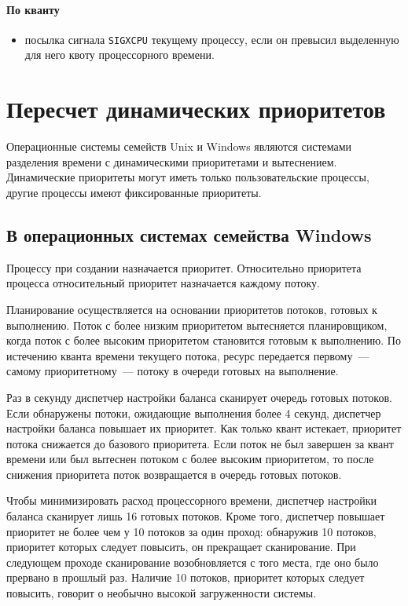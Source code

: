 \documentclass[14pt]{extarticle}
\begin{document}
\paragraph{По кванту}
\begin{itemize}
    \item посылка сигнала \texttt{SIGXCPU} текущему процессу, если он превысил
        выделенную для него квоту процессорного времени.
\end{itemize}

\section{Пересчет динамических приоритетов}

Операционные системы семейств Unix и Windows являются системами разделения
времени с динамическими приоритетами и вытеснением. Динамические приоритеты
могут иметь только пользовательские процессы, другие процессы имеют
фиксированные приоритеты.

\subsection{В операционных системах семейства Windows}

Процессу при создании назначается приоритет. Относительно приоритета процесса
относительный приоритет назначается каждому потоку.

Планирование осуществляется на основании приоритетов потоков, готовых к
выполнению. Поток с более низким приоритетом вытесняется планировщиком, когда
поток с более высоким приоритетом становится готовым к выполнению. По истечению
кванта времени текущего потока, ресурс передается первому~--- самому
приоритетному~--- потоку в очереди готовых на выполнение.

Раз в секунду диспетчер настройки баланса сканирует очередь готовых потоков.
Если обнаружены потоки, ожидающие выполнения более 4 секунд, диспетчер
настройки баланса повышает их приоритет. Как только квант истекает, приоритет
потока снижается до базового приоритета. Если поток не был завершен за квант
времени или был вытеснен потоком с более высоким приоритетом, то после снижения
приоритета поток возвращается в очередь готовых потоков.

Чтобы минимизировать расход процессорного времени, диспетчер настройки баланса
сканирует лишь 16 готовых потоков. Кроме того, диспетчер повышает приоритет не
более чем у 10 потоков за один проход: обнаружив 10 потоков, приоритет которых
следует повысить, он прекращает сканирование. При следующем проходе
сканирование возобновляется с того места, где оно было прервано в прошлый раз.
Наличие 10 потоков, приоритет которых следует повысить, говорит о необычно
высокой загруженности системы.
\end{document}
